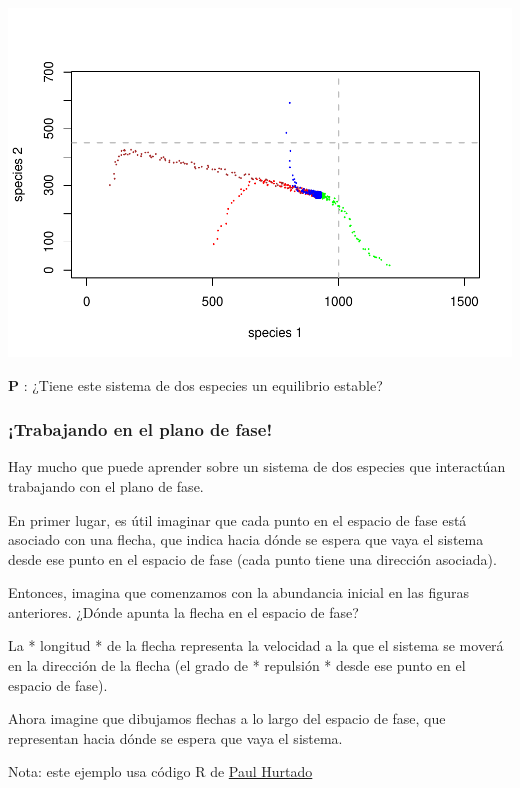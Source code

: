 \documentclass[
]{article}
\begin{document}
\includegraphics{LECTURE16_files/figure-latex/unnamed-chunk-9-1.pdf}

\textbf{P }: ¿Tiene este sistema de dos especies un equilibrio estable?

\hypertarget{trabajando-en-el-plano-de-fase}{%
\subsubsection{¡Trabajando en el plano de
fase!}\label{trabajando-en-el-plano-de-fase}}

Hay mucho que puede aprender sobre un sistema de dos especies que
interactúan trabajando con el plano de fase.

En primer lugar, es útil imaginar que cada punto en el espacio de fase
está asociado con una flecha, que indica hacia dónde se espera que vaya
el sistema desde ese punto en el espacio de fase (cada punto tiene una
dirección asociada).

Entonces, imagina que comenzamos con la abundancia inicial en las
figuras anteriores. ¿Dónde apunta la flecha en el espacio de fase?

La * longitud * de la flecha representa la velocidad a la que el sistema
se moverá en la dirección de la flecha (el grado de * repulsión * desde
ese punto en el espacio de fase).

Ahora imagine que dibujamos flechas a lo largo del espacio de fase, que
representan hacia dónde se espera que vaya el sistema.

Nota: este ejemplo usa código R de
\href{http://www.pauljhurtado.com/}{Paul Hurtado}
\end{document}
